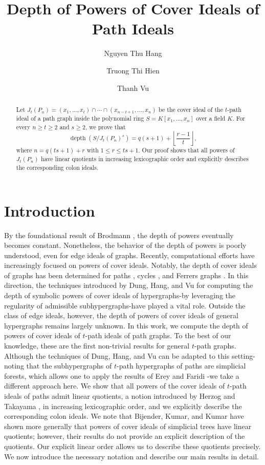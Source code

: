 \documentclass[12pt]{amsart}
\title[Depth of powers of cover ideals]{Depth of Powers of Cover Ideals of Path Ideals}
\author[N.T. Hang]{Nguyen Thu Hang}
\author{Truong Thi Hien}
\author{Thanh Vu}
\date{}
\theoremstyle{definition}
\theoremstyle{remark}
\numberwithin{equation}{section}
\DeclareMathOperator{\depth}{depth}
\begin{document}
\begin{abstract}
Let $ J_t(P_n) = (x_1, \ldots, x_t) \cap \cdots \cap (x_{n-t+1}, \ldots, x_n) $ be the cover ideal of the $t$-path ideal of a path graph inside the polynomial ring $ S = K[x_1, \ldots, x_n] $ over a field $K$. For every $ n \ge t \ge 2 $ and $s \ge 2$, we prove that
\[
\depth \left ( S/J_t(P_n)^s \right ) = q(s+1) + \left\lfloor \frac{r-1}{t} \right\rfloor,
\]
where $ n = q(ts + 1) + r $ with $ 1 \le r \le ts + 1 $. Our proof shows that all powers of $J_t(P_n)$ have linear quotients in increasing lexicographic order and explicitly describes the corresponding colon ideals.
\end{abstract}

\maketitle

\section{Introduction}\label{sec:introduction}
By the foundational result of Brodmann \cite{B}, the depth of powers eventually becomes constant. Nonetheless, the behavior of the depth of powers is poorly understood, even for edge ideals of graphs. Recently, computational efforts have increasingly focused on powers of cover ideals. Notably, the depth of cover ideals of graphs has been determined for paths \cite{DHNT}, cycles \cite{DHV}, and Ferrers graphs \cite{HV}. In this direction, the techniques introduced by Dung, Hang, and Vu \cite{DHV} for computing the depth of symbolic powers of cover ideals of hypergraphs-by leveraging the regularity of admissible subhypergraphs-have played a vital role. Outside the class of edge ideals, however, the depth of powers of cover ideals of general hypergraphs remains largely unknown. In this work, we compute the depth of powers of cover ideals of $t$-path ideals of path graphs. To the best of our knowledge, these are the first non-trivial results for general $t$-path graphs. Although the techniques of Dung, Hang, and Vu \cite{DHV} can be adapted to this setting-noting that the subhypergraphs of $t$-path hypergraphs of paths are simplicial forests, which allows one to apply the results of Erey and Faridi \cite{EF}-we take a different approach here. We show that all powers of the cover ideals of $t$-path ideals of paths admit linear quotients, a notion introduced by Herzog and Takayama \cite{HT}, in increasing lexicographic order, and we explicitly describe the corresponding colon ideals. We note that Bijender, Kumar, and Kumar \cite{BKK} have shown more generally that powers of cover ideals of simplicial trees have linear quotients; however, their results do not provide an explicit description of the quotients. Our explicit linear order allows us to describe these quotients precisely. We now introduce the necessary notation and describe our main results in detail.
\end{document}
